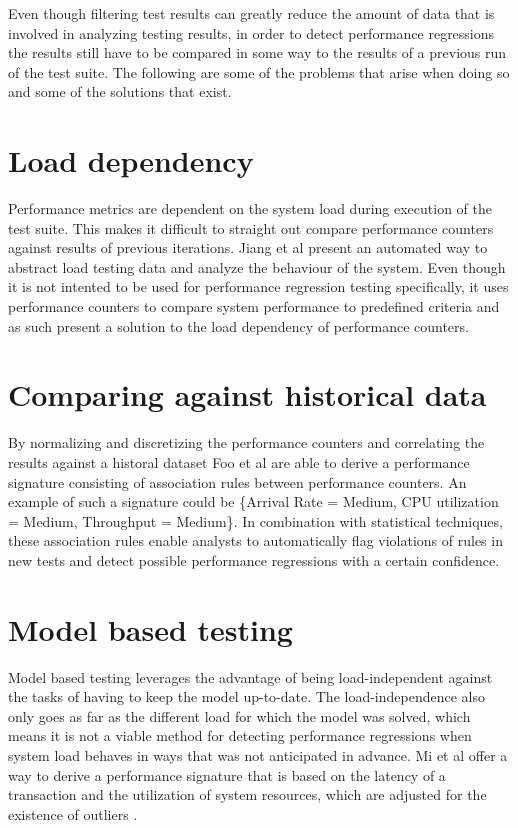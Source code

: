 Even though filtering test results can greatly reduce the amount of data that is involved in analyzing testing results, in order to detect performance regressions the results still have to be compared in some way to the results of a previous run of the test suite. The following are some of the problems that arise when doing so and some of the solutions that exist.

\section{Load dependency}
Performance metrics are dependent on the system load during execution of the test suite. This makes it difficult to straight out compare performance counters against results of previous iterations. Jiang et al present an automated way to abstract load testing data and analyze the behaviour of the system. \cite{jiang2010automated} Even though it is not intented to be used for performance regression testing specifically, it uses performance counters to compare system performance to predefined criteria and as such present a solution to the load dependency of performance counters.

\section{Comparing against historical data}
By normalizing and discretizing the performance counters and correlating the results against a historal dataset Foo et al are able to derive a performance signature \cite{foo2010mining} consisting of association rules between performance counters. An example of such a signature could be \{Arrival Rate = Medium, CPU utilization = Medium, Throughput = Medium\}. In combination with statistical techniques, these association rules enable analysts to automatically flag violations of rules in new tests and detect possible performance regressions with a certain confidence.

\section{Model based testing}
Model based testing leverages the advantage of being load-independent against the tasks of having to keep the model up-to-date. The load-independence also only goes as far as the different load for which the model was solved, which means it is not a viable method for detecting performance regressions when system load behaves in ways that was not anticipated in advance. Mi et al offer a way to derive a performance signature that is based on the latency of a transaction and the utilization of system resources, which are adjusted for the existence of outliers \cite{mi2008analysis}.

